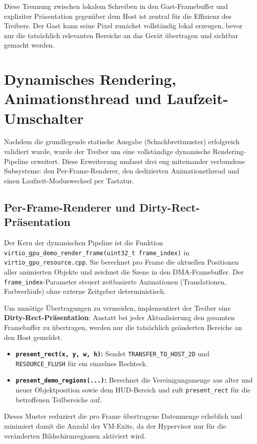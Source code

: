Diese Trennung zwischen lokalem Schreiben in den Gast-Framebuffer und expliziter
Präsentation gegenüber dem Host ist zentral für die Effizienz des Treibers. Der
Gast kann seine Pixel zunächst vollständig lokal erzeugen, bevor nur die
tatsächlich relevanten Bereiche an das Gerät übertragen und sichtbar gemacht
werden.

\section{Dynamisches Rendering, Animationsthread und Laufzeit-Umschalter}
Nachdem die grundlegende statische Ausgabe (Schachbrettmuster) erfolgreich
validiert wurde, wurde der Treiber um eine vollständige dynamische
Rendering-Pipeline erweitert. Diese Erweiterung umfasst drei eng miteinander
verbundene Subsysteme: den Per-Frame-Renderer, den dedizierten
Animationsthread und einen Laufzeit-Moduswechsel per Tastatur.

\subsection{Per-Frame-Renderer und Dirty-Rect-Präsentation}
Der Kern der dynamischen Pipeline ist die Funktion
\texttt{virtio\_gpu\_demo\_render\_frame(uint32\_t frame\_index)} in
\texttt{virtio\_gpu\_resource.cpp}. Sie berechnet pro Frame die aktuellen
Positionen aller animierten Objekte und zeichnet die Szene in den
DMA-Framebuffer. Der \texttt{frame\_index}-Parameter steuert zeitbasierte
Animationen (Translationen, Farbverläufe) ohne externe Zeitgeber
deterministisch.

Um unnötige Übertragungen zu vermeiden, implementiert der Treiber eine
\textbf{Dirty-Rect-Präsentation}: Anstatt bei jeder Aktualisierung den
gesamten Framebuffer zu übertragen, werden nur die tatsächlich geänderten
Bereiche an den Host gemeldet.
\begin{itemize}
    \item \textbf{\texttt{present\_rect(x, y, w, h)}:} Sendet \texttt{TRANSFER\_TO\_HOST\_2D} und \texttt{RESOURCE\_FLUSH} für ein einzelnes Rechteck.
    \item \textbf{\texttt{present\_demo\_regions(...)}:} Berechnet die Vereinigungsmenge aus alter und neuer Objektposition sowie dem HUD-Bereich und ruft \texttt{present\_rect} für die betroffenen Teilbereiche auf.
\end{itemize}
Dieses Muster reduziert die pro Frame übertragene Datenmenge erheblich und
minimiert damit die Anzahl der VM-Exits, da der Hypervisor nur für die
veränderten Bildschirmregionen aktiviert wird.


